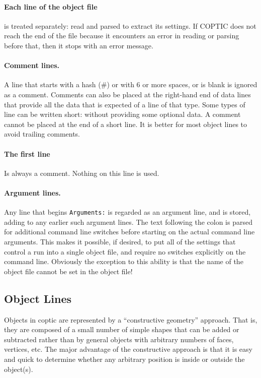 \documentclass[12pt]{article}
\begin{document}
\paragraph{Each line of the object file} is treated separately: read and parsed to
extract its settings. If COPTIC does not reach the end of the file
because it encounters an error in reading or parsing before that, then
it stops with an error message.

\paragraph{Comment lines.} A line that starts with a hash (\#) 
or with 6 or more spaces, or is blank is ignored as a
comment. Comments can also be placed at the right-hand end of data
lines that provide all the data that is expected of a line of that
type. Some types of line can be written short: without providing some
optional data. A comment cannot be placed at the end of a short line.
It is better for most object lines to avoid trailing comments.

\paragraph{The first line} Is always a comment. Nothing on this line is used.

\paragraph{Argument lines.} Any line that begins \verb!Arguments:! is
regarded as an argument line, and is stored, adding to any earlier
such argument lines. The text following the colon is parsed for
additional command line switches before starting on the actual command
line arguments. This makes it possible, if desired, to put all of the
settings that control a run into a single object file, and require no
switches explicitly on the command line. Obviously the exception to
this ability is that the name of the object file cannot be set in the
object file!

\subsection{Object Lines}

Objects in coptic are represented by a ``constructive geometry''
approach. That is, they are composed of a small number of simple
shapes that can be added or subtracted rather than by general objects
with arbitrary numbers of faces, vertices, etc. The major advantage of
the constructive approach is that it is easy and quick to determine
whether any arbitrary position is inside or outside the object(s).
\end{document}
